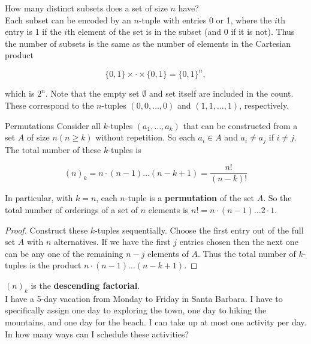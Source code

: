         \textit{} How many distinct subsets does a set of size $n$ have? \\

        Each subset can be encoded by an $n$-tuple with entries 0 or 1, where the $i$th entry is 1 if the $i$th element of the set is in the subset (and 0 if it is not). Thus the number of subsets is the same as the
        number of elements in the Cartesian product

        \[
            \{0,1\} \times \cdot \times \{0,1\} = \{0,1\}^n,
        \]

        which is $2^n$. Note that the empty set $\emptyset$ and set itself are included in the count. These correspond to the $n$-tuples $(0,0,\dots,0)$ and $(1,1,\dots,1)$, respectively.

        \begin{axiom}{Permutations}
            Consider all $k$-tuples $(a_1, \dots, a_k)$ that can be constructed from a set $A$ of size $n(n\geq k)$ without repetition. So each $a_i \in A$ and $a_i \not = a_j$ if $i\not = j$. The total number of these
            $k$-tuples is

            \[
                (n)_k = n\cdot (n-1) \dots (n-k+1) = \frac{n!}{(n-k)!}
            \]

            In particular, with $k=n$, each $n$-tuple is a \textbf{permutation} of the set $A$. So the total number of orderings of a set of $n$ elements is $n! = n\cdot (n-1)\dots 2 \cdot 1$.
        \end{axiom}

        \begin{proof}
            Construct these $k$-tuples sequentially. Choose the first entry out of the full set $A$ with $n$ alternatives. If we have the first $j$ entries chosen then the next one can be any one of the remaining
            $n-j$ elements of $A$. Thus the total number of $k$-tuples is the product $n\cdot (n-1) \dots (n-k+1).$
        \end{proof}

        $(n)_k$ is the \textbf{descending factorial}. \\

        \textit{} I have a 5-day vacation from Monday to Friday in Santa Barbara. I have to specifically assign one day to exploring the town, one day to hiking the mountains, and one day for the beach.
        I can take up at most one activity per day. In how many ways can I schedule these activities? \\


